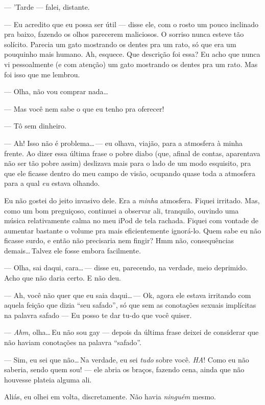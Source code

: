 --- 'Tarde --- falei, distante.

--- Eu acredito que eu possa ser útil --- disse ele, com o rosto um pouco inclinado pra baixo, fazendo os olhos parecerem maliciosos. O sorriso nunca esteve tão solícito. Parecia um gato mostrando os dentes pra um rato, só que era um pouquinho mais humano. Ah, esquece. Que descrição foi essa? Eu acho que nunca vi pessoalmente (e com atenção) um gato mostrando os dentes pra um rato. Mas foi isso que me lembrou.

--- Olha, não vou comprar nada\ldots

--- Mas você nem sabe o que eu tenho pra oferecer!

--- Tô sem dinheiro.

--- Ah! Isso não é problema\ldots\,--- eu olhava, viajão, para a atmosfera à minha frente. Ao dizer essa última frase o pobre diabo (que, afinal de contas, aparentava não ser tão pobre assim) deslizava mais para o lado de um modo esquisito, pra que ele ficasse dentro do meu campo de visão, ocupando quase toda a atmosfera para a qual \emph{eu} estava olhando.

Eu não gostei do jeito invasivo dele. Era a \emph{minha} atmosfera. Fiquei irritado. Mas, como um bom preguiçoso, continuei a observar ali, tranquilo, ouvindo uma música relativamente calma no meu iPod de tela rachada. Fiquei com vontade de aumentar bastante o volume pra mais eficientemente ignorá-lo. Quem sabe eu não ficasse surdo, e então não precisaria nem fingir? Hmm não, consequências demais\ldots\,Talvez ele fosse embora facilmente.

--- Olha, sai daqui, cara\ldots\,--- disse eu, parecendo, na verdade, meio deprimido. Acho que não daria certo. E não deu.

--- Ah, você não quer que eu saia daqui\ldots\,--- Ok, agora ele estava irritando com aquela feição que dizia ``seu safado'', só que sem as conotações sexuais implícitas na palavra safado --- Eu posso te dar tu-do que você quiser.

--- \emph{Ahm}, olha\ldots\,Eu não sou gay --- depois da última frase deixei de considerar que não haviam conotações na palavra ``safado''.

--- Sim, eu sei que não\ldots\,Na verdade, eu sei \emph{tudo} sobre você. \emph{HA}! Como eu não saberia, sendo quem sou! --- ele abria os braços, fazendo cena, ainda que não houvesse plateia alguma ali.

Aliás, eu olhei em volta, discretamente. Não havia \emph{ninguém} mesmo.

